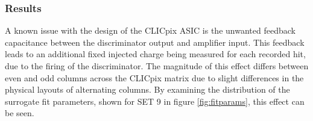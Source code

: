 
\subsubsection{Results}
\label{sec:testpulsecalibrationresults}
A known issue with the design of the CLICpix ASIC is the unwanted feedback capacitance between the discriminator output and amplifier input.  This feedback leads to an additional fixed injected charge being measured for each recorded hit, due to the firing of the discriminator.  The magnitude of this effect differs between even and odd columns across the CLICpix matrix due to slight differences in the physical layouts of alternating columns.  By examining the distribution of the surrogate fit parameters, shown for SET 9 in figure \ref{fig:fitparams}, this effect can be seen.  

